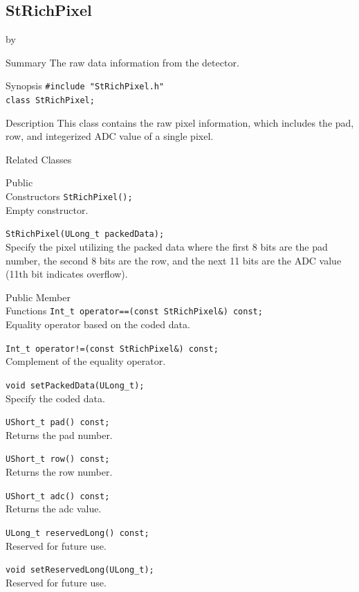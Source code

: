 \documentclass[twoside]{article}
\newcommand{\entrylabel}[1]{\mbox{\textbf{{#1}}}\hfil}%
\newenvironment{entry}
{\begin{list}{}%
    {\renewcommand{\makelabel}{\entrylabel}%
     \setlength{\labelwidth}{90pt}%
     \setlength{\leftmargin}{\labelwidth}
     \advance\leftmargin by \labelsep%
      }%
    }%
  {\end{list}}
\newcommand{\Entrylabel}[1]%
{\raisebox{0pt}[1ex][0pt]{\makebox[\labelwidth][l]%
    {\parbox[t]{\labelwidth}{\hspace{0pt}\textbf{{#1}}}}}}
\newenvironment{Entry}%
{\renewcommand{\entrylabel}{\Entrylabel}\begin{entry}}%
  {\end{entry}}
\begin{document}
\subsection{StRichPixel}
\label{sec:StRichPixel}
\begin{Entry}
\item[Summary] The raw data information from the detector.
\item[Synopsis]
    \verb+#include "StRichPixel.h"+\\
    \verb+class StRichPixel;+\\
\item[Description] This class contains the raw pixel
    information, which includes the pad, row, and integerized
    ADC value of a single pixel.
\item[Related Classes]
\item[Public\\ Constructors]
    \verb+StRichPixel();+\\
    Empty constructor.

    \verb+StRichPixel(ULong_t packedData);+\\
    Specify the pixel utilizing the packed data where
    the first 8 bits are the pad
    number, the second 8 bits are the row, and the next 11 bits
    are the ADC value (11th bit indicates overflow).
\item[Public Member\\ Functions]
    \verb+Int_t operator==(const StRichPixel&) const;+\\
    Equality operator based on the coded data.

    \verb+Int_t operator!=(const StRichPixel&) const;+\\
    Complement of the equality operator.

    \verb+void setPackedData(ULong_t);+\\
    Specify the coded data.

    \verb+UShort_t pad() const;+\\
    Returns the pad number.

    \verb+UShort_t row() const;+\\
    Returns the row number.

    \verb+UShort_t adc() const;+\\
    Returns the adc value.

    \verb+ULong_t reservedLong() const;+\\
    Reserved for future use.

    \verb+void setReservedLong(ULong_t);+\\
    Reserved for future use.
\end{Entry}
\clearpage
\end{document}
